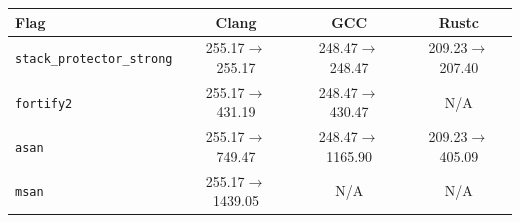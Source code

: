 \begin{tabular*}{\columnwidth}{@{\extracolsep\fill}lccc@{\extracolsep\fill}}
\toprule
\textbf{Flag} & \textbf{Clang} & \textbf{GCC} & \textbf{Rustc} \\
\midrule
\texttt{stack\_protector\_strong} & 255.17$\to$255.17 & 248.47$\to$248.47 & 209.23$\to$207.40 \\
\texttt{fortify2} & 255.17$\to$431.19 & 248.47$\to$430.47 & N/A \\
\texttt{asan} & 255.17$\to$749.47 & 248.47$\to$1165.90 & 209.23$\to$405.09 \\
\texttt{msan} & 255.17$\to$1439.05 & N/A & N/A \\
\bottomrule
\end{tabular*}
